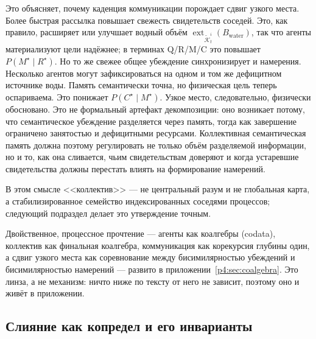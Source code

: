 \documentclass{article}
\begin{document}
Это объясняет, почему каденция коммуникации порождает сдвиг узкого
места. Более быстрая рассылка повышает свежесть свидетельств соседей.
Это, как правило, расширяет или улучшает водный объём
$\operatorname{ext}_{\widetilde{\mathcal{K}}_t^i}(B_{\mathrm{water}})$,
так что агенты материализуют цели надёжнее; в терминах Q/R/M/C это
повышает $P(M^\star\mid R^\star)$. Но то же свежее общее убеждение
синхронизирует и намерения. Несколько агентов могут зафиксироваться на
одном и том же дефицитном источнике воды. Память семантически точна,
но физическая цель теперь оспариваема. Это понижает $P(C^\star\mid
M^\star)$. Узкое место, следовательно, физически обосновано. Это не
формальный артефакт декомпозиции: оно возникает потому, что
семантическое убеждение разделяется через память, тогда как завершение
ограничено занятостью и дефицитными ресурсами. Коллективная
семантическая память должна поэтому регулировать не только объём
разделяемой информации, но и то, как она сливается, чьим
свидетельствам доверяют и когда устаревшие свидетельства должны
перестать влиять на формирование намерений.

В этом смысле <<коллектив>> --- не центральный разум и не глобальная
карта, а стабилизированное семейство индексированных соседями
процессов; следующий подраздел делает это утверждение точным.

Двойственное, процессное прочтение --- агенты как коалгебры (codata),
коллектив как финальная коалгебра, коммуникация как корекурсия глубины
один, а сдвиг узкого места как соревнование между бисимилярностью
убеждений и бисимилярностью намерений --- развито в
приложении~\ref{p4:sec:coalgebra}. Это линза, а не механизм: ничто ниже
по тексту от него не зависит, поэтому оно и живёт в приложении.

\subsection{Слияние как копредел и его инварианты}
\label{p4:sec:colimit}
\end{document}
